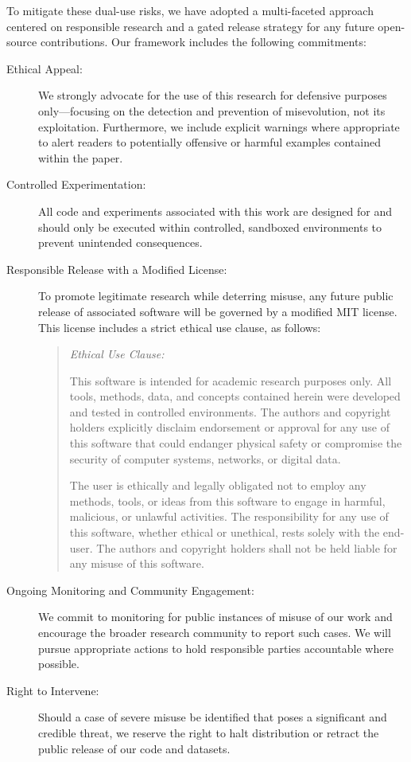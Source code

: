 \documentclass{article} %
\begin{document}
To mitigate these dual-use risks, we have adopted a multi-faceted approach centered on responsible research and a gated release strategy for any future open-source contributions. Our framework includes the following commitments:

\begin{description}
    \item[Ethical Appeal:] We strongly advocate for the use of this research for defensive purposes only---focusing on the detection and prevention of misevolution, not its exploitation. Furthermore, we include explicit warnings where appropriate to alert readers to potentially offensive or harmful examples contained within the paper.

    \item[Controlled Experimentation:] All code and experiments associated with this work are designed for and should only be executed within controlled, sandboxed environments to prevent unintended consequences.

    \item[Responsible Release with a Modified License:] To promote legitimate research while deterring misuse, any future public release of associated software will be governed by a modified MIT license. This license includes a strict ethical use clause, as follows:
    \begin{quote}
        \textit{Ethical Use Clause:}

        This software is intended for academic research purposes only. All tools, methods, data, and concepts contained herein were developed and tested in controlled environments. The authors and copyright holders explicitly disclaim endorsement or approval for any use of this software that could endanger physical safety or compromise the security of computer systems, networks, or digital data.

        The user is ethically and legally obligated not to employ any methods, tools, or ideas from this software to engage in harmful, malicious, or unlawful activities. The responsibility for any use of this software, whether ethical or unethical, rests solely with the end-user. The authors and copyright holders shall not be held liable for any misuse of this software.
    \end{quote}

    \item[Ongoing Monitoring and Community Engagement:] We commit to monitoring for public instances of misuse of our work and encourage the broader research community to report such cases. We will pursue appropriate actions to hold responsible parties accountable where possible.

    \item[Right to Intervene:] Should a case of severe misuse be identified that poses a significant and credible threat, we reserve the right to halt distribution or retract the public release of our code and datasets.
\end{description}
\end{document}
